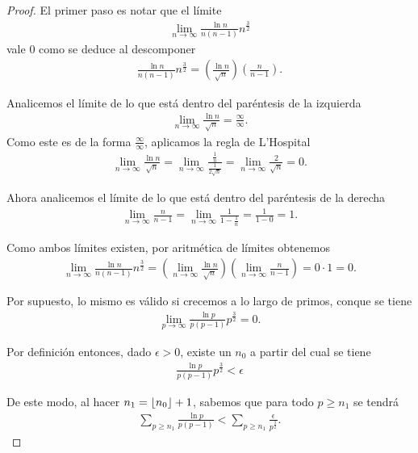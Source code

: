 \begin{proof}
El primer paso es notar que el l\'imite
\begin{align}
\lim_{n \to \infty} \frac{\ln n}{n (n - 1)} n^\frac{3}{2}
\end{align}
vale $0$ como se deduce al descomponer 
\begin{align}
\frac{\ln n}{n (n - 1)} n^\frac{3}{2} = \left(\frac{\ln n}{\sqrt{n}}\right)\left(\frac{n}{n - 1}\right).
\end{align}

Analicemos el l\'imite de lo que est\'a dentro del par\'entesis de la izquierda
\begin{align}
\lim_{n \to \infty} \frac{\ln n}{\sqrt{n}} = \frac{\infty}{\infty}.
\end{align}
Como este es de la forma $\frac{\infty}{\infty}$, aplicamos la regla de L'Hospital
\begin{align}
\lim_{n \to \infty} \frac{\ln n}{\sqrt{n}}
= \lim_{n \to \infty}\frac{\frac{1}{n}}{\frac{1}{2\sqrt{n}}}
= \lim_{n \to \infty} \frac{2}{\sqrt{n}} = 0.
\end{align}

Ahora analicemos el l\'imite de lo que est\'a dentro del par\'entesis de la derecha
\begin{align}
\lim_{n \to \infty} \frac{n}{n - 1}
= \lim_{n \to \infty} \frac{1}{1 - \frac{1}{n}}
= \frac{1}{1 - 0} = 1.
\end{align}

Como ambos l\'imites existen, por aritm\'etica de l\'imites obtenemos
\begin{align}
\lim_{n \to \infty} \frac{\ln n}{n (n - 1)} n^\frac{3}{2}
= \left(\lim_{n \to \infty} \frac{\ln n}{\sqrt{n}}\right)\left(\lim_{n \to \infty} \frac{n}{n - 1}\right)
= 0 \cdot 1 = 0.
\end{align}

Por supuesto, lo mismo es v\'alido si crecemos a lo largo de primos, conque se tiene 
\begin{align}
\lim_{p \to \infty} \frac{\ln p}{p (p - 1)} p^\frac{3}{2}=0.
\end{align}

Por definici\'on entonces, dado $\epsilon > 0$, existe un $n_0$ 
a partir del cual se tiene 
\begin{align}
\frac{\ln p}{p (p - 1)} p^\frac{3}{2} < \epsilon
\end{align}

De este modo, al hacer $n_1 = \left\lfloor n_0 \right\rfloor + 1$, sabemos que para todo $p \geq n_1$ se tendr\'a 
\begin{align}
\sum_{p \geq n_1} \frac{\ln p}{p (p - 1)} <  \sum_{p \geq n_1} \frac{\epsilon}{p^\frac{3}{2}}. 
\end{align}


\end{proof}
